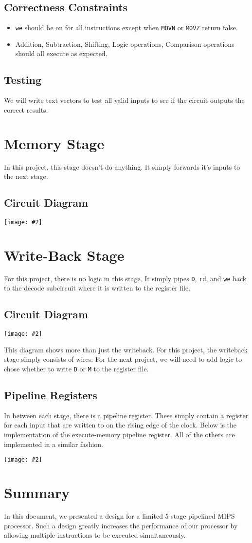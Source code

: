 \documentclass[10pt]{article}
\newcommand{\diagram}[2][1]{\begin{center}\texttt{[image: \#2]}\end{center}}
\begin{document}
\subsection{Correctness Constraints}
\begin{itemize}
\item \texttt{we} should be on for all instructions except when \texttt{MOVN} or \texttt{MOVZ} return false.
\item Addition, Subtraction, Shifting, Logic operations, Comparison operations should all execute as expected. 
\end{itemize}
\subsection{Testing}
We will write text vectors to test all valid inputs to see if the circuit outputs the correct results.
\section{Memory Stage}
In this project, this stage doesn't do anything. It simply forwards it's inputs to the next stage. 
\subsection{Circuit Diagram}
\diagram[0.5]{memory}
\section{Write-Back Stage}
For this project, there is no logic in this stage. It simply pipes \texttt{D}, \texttt{rd}, and \texttt{we} back to the decode subcircuit where it is written to the register file.
\subsection{Circuit Diagram}
\diagram[0.7]{writeback}
This diagram shows more than just the writeback. For this project, the writeback stage simply consists of wires.
For the next project, we will need to add logic to chose whether to write \texttt{D} or \texttt{M} to the register file.
\subsection{Pipeline Registers}
In between each stage, there is a pipeline register. These simply contain a register for each input that are written to on the rising edge of the clock.
Below is the implementation of the execute-memory pipeline register. All of the others are implemented in a similar fashion.
\diagram[0.6]{pipeline}
\section{Summary}
In this document, we presented a design for a limited 5-stage pipelined MIPS processor. Such a design greatly increases the performance of our processor by
allowing multiple instructions to be executed simultaneously.
\end{document}
